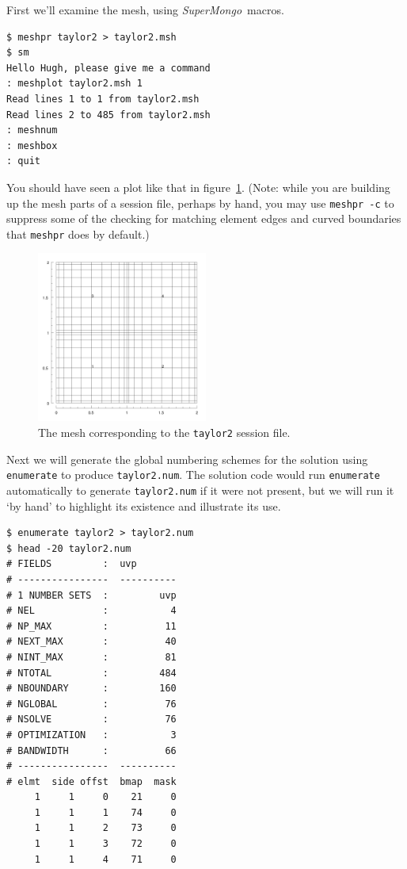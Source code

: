 \documentclass[11pt]{report}
\newcommand{\SM}{\emph{SuperMongo}}
\begin{document}
First we'll examine the mesh, using \SM\ macros.
{\small
\begin{verbatim}
$ meshpr taylor2 > taylor2.msh
$ sm
Hello Hugh, please give me a command
: meshplot taylor2.msh 1
Read lines 1 to 1 from taylor2.msh
Read lines 2 to 485 from taylor2.msh
: meshnum
: meshbox
: quit
\end{verbatim}
}
\noindent
You should have seen a plot like that in figure~\ref{tay2msh}. (Note:
while you are building up the mesh parts of a session file, perhaps by
hand, you may use \texttt{meshpr -c} to suppress some of the checking
for matching element edges and curved boundaries that \texttt{meshpr}
does by default.)
\begin{figure}
\begin{center}
\includegraphics[width=0.5\textwidth]{taylor2mesh}
\end{center}
\caption{
\label{tay2msh}
  The mesh corresponding to the \texttt{taylor2} session file.
}
\end{figure}

Next we will generate the global numbering schemes for the solution
using \texttt{enumerate} to produce \texttt{taylor2.num}.  The
solution code would run \texttt{enumerate} automatically to generate
\texttt{taylor2.num} if it were not present, but we will run it `by
hand' to highlight its existence and illustrate its use.
{\small
\begin{verbatim}
$ enumerate taylor2 > taylor2.num
$ head -20 taylor2.num
# FIELDS         :  uvp
# ----------------  ----------
# 1 NUMBER SETS  :         uvp
# NEL            :           4
# NP_MAX         :          11
# NEXT_MAX       :          40
# NINT_MAX       :          81
# NTOTAL         :         484
# NBOUNDARY      :         160
# NGLOBAL        :          76
# NSOLVE         :          76
# OPTIMIZATION   :           3
# BANDWIDTH      :          66
# ----------------  ----------
# elmt  side offst  bmap  mask
     1     1     0    21     0
     1     1     1    74     0
     1     1     2    73     0
     1     1     3    72     0
     1     1     4    71     0
\end{verbatim}
}
\end{document}
